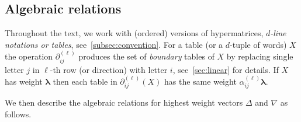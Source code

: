 \documentclass[12pt, reqno]{amsart}
\theoremstyle{definition}
\begin{document}
\subsection{Algebraic relations}
Throughout the text, we work with (ordered) versions of hypermatrices, \textit{$d$-line notations or tables}, see \textsection\,\ref{subsec:convention}.
For a table (or a $d$-tuple of words) $X$ the operation $\partial^{(\ell)}_{i j}$ produces the set of {\it boundary} tables of $X$ by replacing single letter $j$ in $\ell$-th row (or direction) with letter $i$, see \textsection\,\ref{sec:linear} for details. If $X$ has weight $\pmb{\lambda}$ then each table in $\partial_{ij}^{(\ell)}(X)$ has the same weight $\alpha^{(\ell)}_{ij}\pmb{\lambda}$.

\vspace{0.5em}

We then describe the algebraic relations for highest weight vectors $\Delta$ and $\nabla$ as follows.
\end{document}
